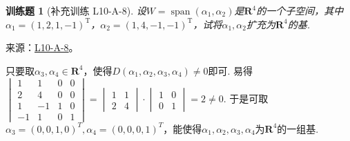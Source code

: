\documentclass[12pt,fontset=fandol]{ctexart}
\newtheorem{exercise}{训练题}[section]
\begin{document}
\begin{exercise}[补充训练 L10-A-8]\label{prob:L10-A-8}
设$W=\operatorname{span}(\alpha_1,\alpha_2)$是$\mathbf{R}^4$的一个子空间，其中$\alpha_1=(1,2,1,-1)^\mathrm{T}$，$\alpha_2=(1,4,-1,-1)^\mathrm{T}$，试将$\alpha_1,\alpha_2$扩充为$\mathbf{R}^4$的基.
\end{exercise}
\noindent 来源：\href{https://github.com/yhwu-is/Linear-Algebra-Left-Undone/blob/new/%E8%AE%B2%E4%B9%89/%E4%B8%93%E9%A2%98/10%20%E8%A1%8C%E5%88%97%E5%BC%8F.tex}{L10-A-8}。
\begin{solve}
只要取$\alpha_3,\alpha_4 \in \mathbf{R}^4$，使得$D(\alpha_1,\alpha_2,\alpha_3,\alpha_4) \neq 0$即可. 易得$\begin{vmatrix}
                1  & 1  & 0 & 0 \\
                2  & 4  & 0 & 0 \\
                1  & -1 & 1 & 0 \\
                -1 & 1  & 0 & 1
            \end{vmatrix}=\begin{vmatrix}
                1 & 1 \\
                2 & 4
            \end{vmatrix} \cdot \begin{vmatrix}
                1 & 0 \\
                0 & 1
            \end{vmatrix}=2 \neq 0$. 于是可取$\alpha_3=(0,0,1,0)^T,\alpha_4=(0,0,0,1)^T$，能使得${\alpha_1,\alpha_2,\alpha_3,\alpha_4}$为$\mathbf{R}^4$的一组基.
\end{solve}
\end{document}
